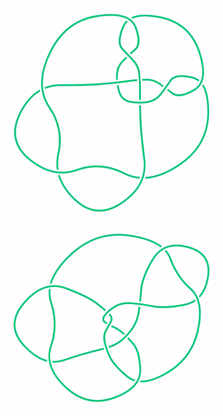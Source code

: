 \begin{figure}[H]
\begin{minipage}[b]{.14\linewidth}
	\end{minipage}
	\begin{minipage}[b]{.14\linewidth}
		\centering
		\includegraphics[width=\linewidth]{../data/perko1.png}
	\end{minipage}
	\begin{minipage}[b]{.14\linewidth}
		\centering
		\includegraphics[width=\linewidth]{../data/perko2.png}
	\end{minipage}
\end{figure}

